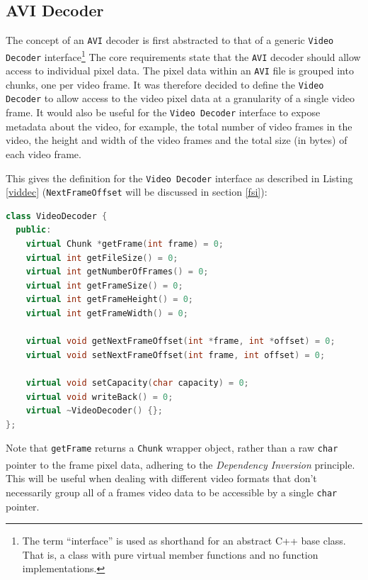 \documentclass[paper=a4, fontsize=11pt,twoside]{scrartcl}
\numberwithin{table}{section}
\numberwithin{figure}{section}
\numberwithin{algorithm}{section}
\begin{document}
\subsection{AVI Decoder}
\label{avidec}

The concept of an \texttt{AVI} decoder is first abstracted to that of a generic \texttt{Video Decoder} interface\footnote{The term ``interface'' is used as shorthand for an abstract C++ base class. That is, a class with pure virtual member functions and no function implementations.} The core requirements state that the \texttt{AVI} decoder should allow access to individual pixel data. The pixel data within an \texttt{AVI} file is grouped into chunks, one per video frame. It was therefore decided to define the \texttt{Video Decoder} to allow access to the video pixel data at a granularity of a single video frame. It would also be useful for the \texttt{Video Decoder} interface to expose metadata about the video, for example, the total number of video frames in the video, the height and width of the video frames and the total size (in bytes) of each video frame.

This gives the definition for the \texttt{Video Decoder} interface as described in Listing \ref{viddec} (\texttt{NextFrameOffset} will be discussed in section \ref{fsi}):

\begin{lstlisting}[language=C++, caption={\texttt{Video Decoder} interface (\texttt{video/video\_decoder.h:15})},frame=single, float,floatplacement=H,label=viddec]
class VideoDecoder {
  public:
    virtual Chunk *getFrame(int frame) = 0;
    virtual int getFileSize() = 0;
    virtual int getNumberOfFrames() = 0;
    virtual int getFrameSize() = 0;
    virtual int getFrameHeight() = 0;
    virtual int getFrameWidth() = 0;
	
    virtual void getNextFrameOffset(int *frame, int *offset) = 0;
    virtual void setNextFrameOffset(int frame, int offset) = 0;
   	   
    virtual void setCapacity(char capacity) = 0;
    virtual void writeBack() = 0;
    virtual ~VideoDecoder() {};
};
\end{lstlisting}

Note that \texttt{getFrame} returns a \texttt{Chunk} wrapper object, rather than a raw \texttt{char} pointer to the frame pixel data, adhering to the \textit{Dependency Inversion} principle\textsuperscript{\cite{inver}}. This will be useful when dealing with different video formats that don't necessarily group all of a frames video data to be accessible by a single \texttt{char} pointer.
\end{document}
